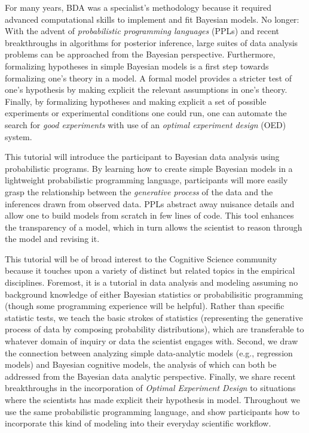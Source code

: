 \documentclass[10pt,letterpaper]{article}
\begin{document}
For many years, BDA was a specialist's methodology because it required advanced computational skills to implement and fit Bayesian models.
No longer: With the advent of \emph{probabilistic programming languages} (PPLs) and recent breakthroughs in algorithms for posterior inference, large suites of data analysis problems can be approached from the Bayesian perspective. 
Furthermore, formalizing hypotheses in simple Bayesian models is a first step towards formalizing one's theory in a model. 
A formal model provides a stricter test of one's hypothesis by making explicit the relevant assumptions in one's theory. 
Finally, by formalizing hypotheses and making explicit a set of possible experiments or experimental conditions one could run, one can automate the search for \emph{good experiments} with use of an \emph{optimal experiment design} (OED) system.

This tutorial will introduce the participant to Bayesian data analysis using probabilistic programs. 
By learning how to create simple Bayesian models in a lightweight probabilistic programming language, participants will more easily grasp the relationship between the \emph{generative process} of the data and the inferences drawn from observed data.
PPLs abstract away nuisance details and allow one to build models from scratch in few lines of code. 
This tool enhances the transparency of a model, which in turn allows the scientist to reason through the model and revising it. 

This tutorial will be of broad interest to the Cognitive Science community because it touches upon a variety of distinct but related topics in the empirical disciplines. 
Foremost, it is a tutorial in data analysis and modeling assuming no background knowledge of either Bayesian statistics or probabilisitic programming (though some programming experience will be helpful). 
Rather than specific statistic tests, we teach the basic strokes of statistics (representing the generative process of data by composing probability distributions), which are transferable to whatever domain of inquiry or data the scientist engages with. 
Second, we draw the connection between analyzing simple data-analytic models (e.g., regression models) and Bayesian cognitive models, the analysis of which can both be addressed from the Bayesian data analytic perspective.
Finally, we share recent breakthroughs in the incorporation of \emph{Optimal Experiment Design} to situations where the scientists has made explicit their hypothesis in model. 
Throughout we use the same probabilistic programming language, and show participants how to incorporate this kind of modeling into their everyday scientific workflow. 
\end{document}
